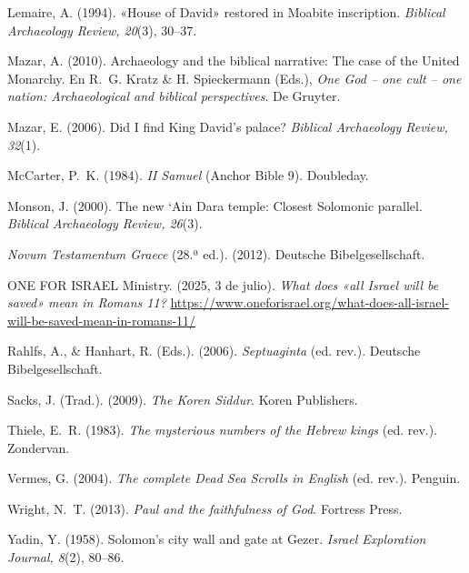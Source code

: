 \documentclass[11pt,letterpaper]{article}
\newcommand{\refapa}[1]{\par{\RaggedRight\hangindent=1.27cm\hangafter=1\noindent #1\par}\vspace{4pt}}
\begin{document}
\refapa{Lemaire, A. (1994). «House of David» restored in Moabite inscription. \emph{Biblical Archaeology Review, 20}(3), 30--37.}
\refapa{Mazar, A. (2010). Archaeology and the biblical narrative: The case of the United Monarchy. En R.~G. Kratz \& H. Spieckermann (Eds.), \emph{One God -- one cult -- one nation: Archaeological and biblical perspectives}. De Gruyter.}
\refapa{Mazar, E. (2006). Did I find King David's palace? \emph{Biblical Archaeology Review, 32}(1).}
\refapa{McCarter, P.~K. (1984). \emph{II Samuel} (Anchor Bible 9). Doubleday.}
\refapa{Monson, J. (2000). The new \textquoteleft Ain Dara temple: Closest Solomonic parallel. \emph{Biblical Archaeology Review, 26}(3).}
\refapa{\emph{Novum Testamentum Graece} (28.ª ed.). (2012). Deutsche Bibelgesellschaft.}
\refapa{ONE FOR ISRAEL Ministry. (2025, 3 de julio). \emph{What does «all Israel will be saved» mean in Romans 11?} \url{https://www.oneforisrael.org/what-does-all-israel-will-be-saved-mean-in-romans-11/}}
\refapa{Rahlfs, A., \& Hanhart, R. (Eds.). (2006). \emph{Septuaginta} (ed. rev.). Deutsche Bibelgesellschaft.}
\refapa{Sacks, J. (Trad.). (2009). \emph{The Koren Siddur}. Koren Publishers.}
\refapa{Thiele, E.~R. (1983). \emph{The mysterious numbers of the Hebrew kings} (ed. rev.). Zondervan.}
\refapa{Vermes, G. (2004). \emph{The complete Dead Sea Scrolls in English} (ed. rev.). Penguin.}
\refapa{Wright, N.~T. (2013). \emph{Paul and the faithfulness of God}. Fortress Press.}
\refapa{Yadin, Y. (1958). Solomon's city wall and gate at Gezer. \emph{Israel Exploration Journal, 8}(2), 80--86.}
\end{document}
